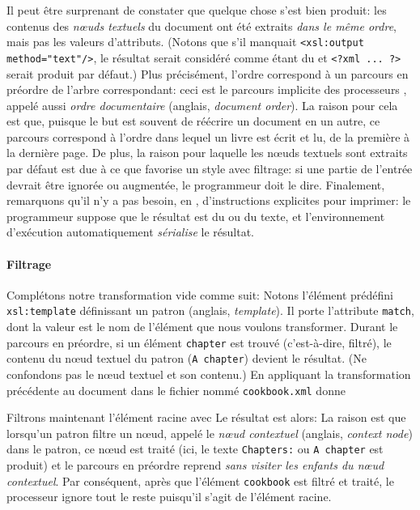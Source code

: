 Il peut être surprenant de constater que quelque chose s'est bien
produit: les contenus des \emph{n{\oe}uds textuels} du document \XML
ont été extraits \emph{dans le même ordre}, mais pas les valeurs
d'attributs. (Notons que s'il manquait
\verb|<xsl:output method="text"/>|, le résultat serait considéré comme
étant du \XML et \verb|<?xml ... ?>| serait produit par défaut.) Plus
précisément, l'ordre correspond à un parcours en préordre de l'arbre
\XML correspondant: ceci est le parcours implicite des processeurs
\XSLT, appelé aussi \emph{ordre documentaire} (anglais, \emph{document
  order}). La raison pour cela est que, puisque le but est souvent de
réécrire un document en un autre, ce parcours correspond à l'ordre
dans lequel un livre est écrit et lu, de la première à la dernière
page. De plus, la raison pour laquelle les n{\oe}uds textuels sont
extraits par défaut est due à ce que \XSLT favorise un style avec
filtrage: si une partie de l'entrée devrait être ignorée ou augmentée,
le programmeur doit le dire. Finalement, remarquons qu'il n'y a pas
besoin, en \XSLT, d'instructions explicites pour imprimer: le
programmeur suppose que le résultat est du \XML ou du texte, et
l'environnement d'exécution automatiquement \emph{sérialise} le
résultat.

\paragraph{Filtrage}
\label{par:matching}

Complétons notre transformation vide comme suit:
\noindent Notons l'élément prédéfini \texttt{xsl:template} définissant
un patron (anglais, \emph{template}). Il porte l'attribute
\texttt{match}, dont la valeur est le nom de l'élément que nous
voulons transformer. Durant le parcours en préordre, si un élément
\texttt{chapter} est trouvé (c'est-à-dire, filtré), le contenu du
n{\oe}ud textuel du patron (\texttt{A chapter}) devient le
résultat. (Ne confondons pas le n{\oe}ud textuel et son contenu.) En
appliquant la transformation précédente au document
dans le fichier nommé \texttt{cookbook.xml} donne

\noindent Filtrons maintenant l'élément racine avec
\noindent Le résultat est alors:
\noindent La raison est que lorsqu'un patron filtre un n{\oe}ud,
appelé le \emph{n{\oe}ud contextuel} (anglais, \emph{context node})
dans le patron, ce n{\oe}ud est traité (ici, le texte
\texttt{Chapters:} ou \texttt{A chapter} est produit) et le parcours
en préordre reprend \emph{sans visiter les enfants du n{\oe}ud
  contextuel}. Par conséquent, après que l'élément \texttt{cookbook}
est filtré et traité, le processeur \XSLT ignore tout le reste
puisqu'il s'agit de l'élément racine.


